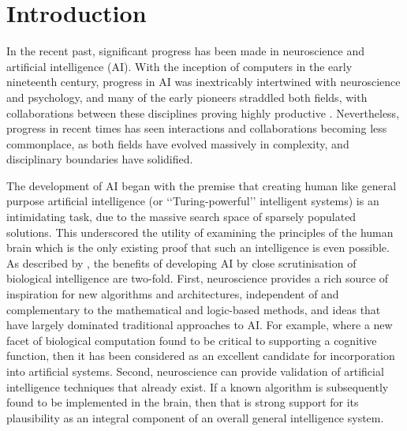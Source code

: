 
\chapter{Introduction} %

\label{chap:intro} %


\newcommand{\keyword}[1]{\textbf{#1}}
\newcommand{\tabhead}[1]{\textbf{#1}}
\newcommand{\code}[1]{\texttt{#1}}
\newcommand{\file}[1]{\texttt{\bfseries#1}}
\newcommand{\option}[1]{\texttt{\itshape#1}}

In the recent past, significant progress has been made in neuroscience and artificial intelligence (AI). With the inception of computers in the early nineteenth century, progress in AI was inextricably intertwined with neuroscience and psychology, and many of the early pioneers straddled both fields, with collaborations between these disciplines proving highly productive \citep{turing1950computing, hinton1986distributed, mcculloch1943logical, hebb1949organization, churchland1988perspectives}. Nevertheless, progress in recent times has seen interactions and collaborations becoming less commonplace, as both fields have evolved massively in complexity, and disciplinary boundaries have solidified. 

The development of AI began with the premise that creating human like general purpose artificial intelligence (or ‘‘Turing-powerful’’ intelligent systems) is an intimidating task, due to the massive search space of sparsely populated solutions. This underscored the utility of examining the principles of the human brain which is the only existing proof that such an intelligence is even possible. As described by \citet{hassabis2017neuroscience}, the benefits of developing AI by close scrutinisation of biological intelligence are two-fold. First, neuroscience provides a rich source of inspiration for new algorithms and architectures, independent of and complementary to the mathematical and logic-based methods, and ideas that have largely dominated traditional approaches to AI. For example, where a new facet of biological computation found to be critical to supporting a cognitive function, then it has been considered as an excellent candidate for incorporation into artificial systems. Second, neuroscience can provide validation of artificial intelligence techniques that already exist. If a known algorithm is subsequently found to be implemented in the brain, then that is strong support for its plausibility as an integral component of an overall general intelligence system.
